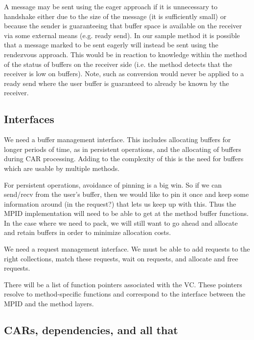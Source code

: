\documentclass[11pt,letterpaper]{article}
\begin{document}

A message may be sent using the eager approach if it is unnecessary to
handshake either due to the size of the message (it is sufficiently small) or
because the sender is guaranteeing that buffer space is available on the
receiver via some external means (e.g. ready send).  In our sample method it is
possible that a message marked to be sent eagerly will instead be sent using
the rendezvous approach.  This would be in reaction to knowledge within the
method of the status of buffers on the receiver side (i.e. the method detects
that the receiver is low on buffers).  Note, such as conversion would never be
applied to a ready send where the user buffer is guaranteed to already be known
by the receiver.

\subsection{Interfaces}

We need a buffer management interface.  This includes allocating buffers for
longer periods of time, as in persistent operations, and the allocating of
buffers during CAR processing.  Adding to the complexity of this is the need
for buffers which are usable by multiple methods.

For persistent operations, avoidance of pinning is a big win.  So if we can
send/recv from the user's buffer, then we would like to pin it once and keep
some information around (in the request?) that lets us keep up with this.  Thus
the MPID implementation will need to be able to get at the method buffer
functions.  In the case where we need to pack, we will still want to go ahead
and allocate and retain buffers in order to minimize allocation costs.

We need a request management interface.  We must be able to add requests to the
right collections, match these requests, wait on requests, and allocate and
free requests.

There will be a list of function pointers associated with the VC.  These
pointers resolve to method-specific functions and correspond to the interface
between the MPID and the method layers.

\subsection{CARs, dependencies, and all that}
\end{document}
